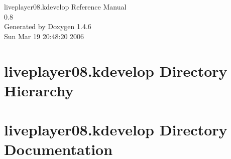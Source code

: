 \documentclass[a4paper]{book}
\begin{document}
\begin{titlepage}
\vspace*{7cm}
\begin{center}
{\Large liveplayer08.kdevelop Reference Manual\\[1ex]\large 0.8 }\\
\vspace*{1cm}
{\large Generated by Doxygen 1.4.6}\\
\vspace*{0.5cm}
{\small Sun Mar 19 20:48:20 2006}\\
\end{center}
\end{titlepage}
\clearemptydoublepage
{}
\tableofcontents
\clearemptydoublepage
{}
\chapter{liveplayer08.kdevelop Directory Hierarchy}

\chapter{liveplayer08.kdevelop Directory Documentation}


\printindex
\end{document}
